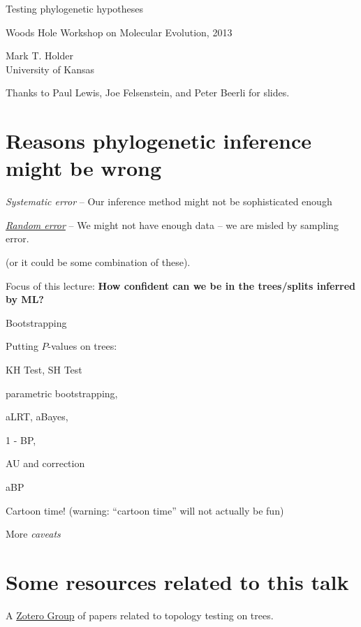 \documentclass[landscape]{foils}
\begin{document}
\myNewSlide
\huge 
{\begin{center}Testing phylogenetic hypotheses\end{center}}
\vskip 3cm
\large Woods Hole Workshop on Molecular Evolution, 2013\par 
\vskip 3cm
\normalsize
\normalsize
Mark T. Holder\\
University of Kansas\par 
\vskip 1cm
Thanks to Paul Lewis, Joe Felsenstein, and Peter Beerli for slides.

\myNewSlide
\section*{Reasons phylogenetic inference might be wrong}
\Large
\begin{compactenum}
	\item {\em Systematic error} -- Our inference method might not be sophisticated enough
	\item \underline{{\em Random error}} -- We might not have enough data --  we are misled by sampling error.
\end{compactenum}

(or it could be some combination of these).

{Focus of this lecture: {\bf How confident can we be in the trees/splits inferred by ML?}}

\myNewSlide
\begin{compactenum}
	\item Bootstrapping
	\item Putting $P$-values on trees:
	\begin{compactitem}
		\item KH Test, SH Test
		\item parametric bootstrapping,
		\item aLRT, aBayes,
		\item 1 - BP,
		\item AU and \citet{EfronHH1996} correction
		\item aBP
	\end{compactitem}
	\item Cartoon time! ({\small warning: ``cartoon time'' will not actually be fun})
	\item More {\em caveats}
\end{compactenum}

\myNewSlide
\section*{Some resources related to this talk}
A \href{http://www.zotero.org/groups/confidence_statements_on_phylogenies}{Zotero Group} of papers related to topology testing on trees.
\end{document}
